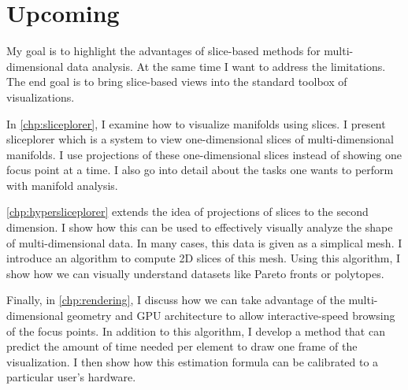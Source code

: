 
\section{Upcoming}
\label{sec:thesis_outline}

My goal is to highlight the advantages of slice-based methods for
multi-dimensional data analysis. At the same time I want to address the
limitations. The end goal is to bring slice-based views into the standard
toolbox of visualizations.

In \autoref{chp:sliceplorer}, I examine how to visualize manifolds using
slices. I present sliceplorer which is a system to view one-dimensional slices
of multi-dimensional manifolds. I use projections of these one-dimensional
slices instead of showing one focus point at a time. I also go into detail
about the tasks one wants to perform with manifold analysis.

\autoref{chp:hypersliceplorer} extends the idea of projections of slices to the
second dimension. I show how this can be used to effectively visually analyze
the shape of multi-dimensional data. In many cases, this data is given as a
simplical mesh. I introduce an algorithm to compute 2D slices of this mesh.
Using this algorithm, I show how we can visually understand datasets like
Pareto fronts or polytopes.

Finally, in \autoref{chp:rendering}, I discuss how we can take advantage of the
multi-dimensional geometry and GPU architecture to allow interactive-speed
browsing of the focus points. In addition to this algorithm, I develop a method
that can predict the amount of time needed per element to draw one frame of the
visualization. I then show how this estimation formula can be calibrated to a
particular user's hardware.

